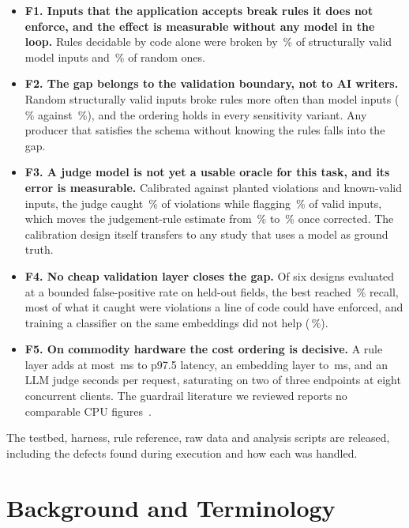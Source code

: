 \documentclass[journal]{IEEEtran}
\newenvironment{tightitemize}{\begin{itemize}%
  \setlength{\itemsep}{1pt}\setlength{\parskip}{0pt}\setlength{\topsep}{2pt}%
  \setlength{\partopsep}{0pt}}{\end{itemize}}
\begin{document}
\begin{tightitemize}
  \item \textbf{F1. Inputs that the application accepts break rules it does not enforce, and the
  effect is measurable without any model in the loop.} Rules decidable by code alone were broken by
  \,\% of structurally valid model inputs and \,\% of random ones.
  \item \textbf{F2. The gap belongs to the validation boundary, not to AI writers.} Random
  structurally valid inputs broke rules more often than model inputs (\,\% against
  \,\%), and the ordering holds in every sensitivity variant. Any producer that satisfies
  the schema without knowing the rules falls into the gap.
  \item \textbf{F3. A judge model is not yet a usable oracle for this task, and its error is
  measurable.} Calibrated against planted violations and known-valid inputs, the judge caught
  \,\% of violations while flagging \,\% of valid inputs, which moves the
  judgement-rule estimate from \,\% to \,\% once corrected. The
  calibration design itself transfers to any study that uses a model as ground truth.
  \item \textbf{F4. No cheap validation layer closes the gap.} Of six designs evaluated at a bounded
  false-positive rate on held-out fields, the best reached \,\% recall, most of what
  it caught were violations a line of code could have enforced, and training a classifier on the same
  embeddings did not help (\,\%).
  \item \textbf{F5. On commodity hardware the cost ordering is decisive.} A rule layer adds at most
  \,ms to p97.5 latency, an embedding layer
   to \,ms, and an LLM judge seconds per request, saturating on
  two of three endpoints at eight concurrent clients. The guardrail literature we reviewed reports no
  comparable CPU figures~\cite{jacob2025promptshield,ahmed2026reflexguard,saleem2026layered,wang2026sokguardrails}.
\end{tightitemize}

The testbed, harness, rule reference, raw data and analysis scripts are released, including the
defects found during execution and how each was handled.

\section{Background and Terminology}
\label{sec:background}
\end{document}
